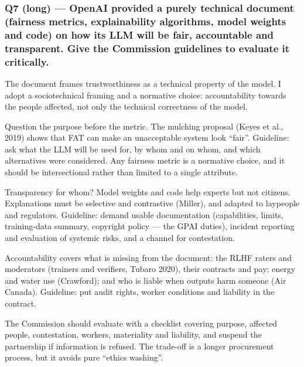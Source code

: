 \documentclass[11pt,a4paper]{article}
\newcommand{\blk}[1]{{\setlength{\fboxsep}{2pt}\colorbox{ink}{\sffamily\footnotesize\bfseries\color{white}\,#1\,}}}
\begin{document}
\subsubsection*{Q7 (long) — OpenAI provided a purely technical document (fairness metrics, explainability algorithms, model weights and code) on how its LLM will be fair, accountable and transparent. Give the Commission guidelines to evaluate it critically.}
\begin{description}[leftmargin=1.2cm,style=sameline]
\item[\blk{F}] The document frames trustworthiness as a technical property of the model. I adopt a sociotechnical framing and a normative choice: accountability towards the people affected, not only the technical correctness of the model.
\item[\blk{A1}] Question the purpose before the metric. The mulching proposal (Keyes et al., 2019) shows that FAT can make an unacceptable system look “fair”. Guideline: ask what the LLM will be used for, by whom and on whom, and which alternatives were considered. Any fairness metric is a normative choice, and it should be intersectional rather than limited to a single attribute.
\item[\blk{A2}] Transparency for whom? Model weights and code help experts but not citizens. Explanations must be selective and contrastive (Miller), and adapted to laypeople and regulators. Guideline: demand usable documentation (capabilities, limits, training-data summary, copyright policy — the GPAI duties), incident reporting and evaluation of systemic risks, and a channel for contestation.
\item[\blk{A3}] Accountability covers what is missing from the document: the RLHF raters and moderators (trainers and verifiers, Tubaro 2020), their contracts and pay; energy and water use (Crawford); and who is liable when outputs harm someone (Air Canada). Guideline: put audit rights, worker conditions and liability in the contract.
\item[\blk{R}] The Commission should evaluate with a checklist covering purpose, affected people, contestation, workers, materiality and liability, and suspend the partnership if information is refused. The trade-off is a longer procurement process, but it avoids pure “ethics washing”.
\end{description}
\end{document}
